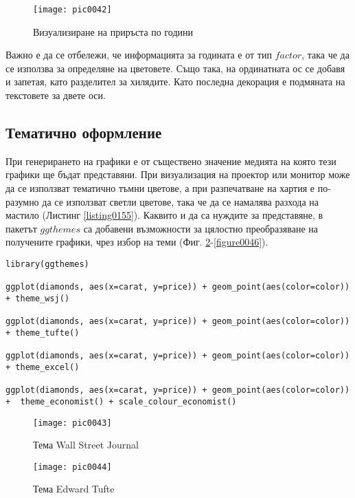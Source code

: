 \begin{figure}[h!]
  \centering
  \texttt{[image: pic0042]}
  \caption{Визуализиране на приръста по години}
\label{figure0042}
\end{figure}
\FloatBarrier

Важно е да се отбележи, че информацията за годината е от тип $factor$, така че да се използва за определяне на цветовете. Също така, на ординатната ос се добавя и запетая, като разделител за хилядите. Като последна декорация е подмяната на текстовете за двете оси. 

\subsection{Тематично оформление}

При генерирането на графики е от съществено значение медията на която тези графики ще бъдат представяни. При визуализация на проектор или монитор може да се използват тематично тъмни цветове, а при разпечатване на хартия е по-разумно да се използват светли цветове, така че да се намалява разхода на мастило (Листинг \ref{listing0155}). Каквито и да са нуждите за представяне, в пакетът $ggthemes$ са добавени възможности за цялостно преобразяване на получените графики, чрез избор на теми (Фиг. \ref{figure0043}-\ref{figure0046}).

\begin{lstlisting}[caption=Избор на теми за визуално представяне, label=listing0155]
library(ggthemes)

ggplot(diamonds, aes(x=carat, y=price)) + geom_point(aes(color=color)) + theme_wsj()

ggplot(diamonds, aes(x=carat, y=price)) + geom_point(aes(color=color)) + theme_tufte()

ggplot(diamonds, aes(x=carat, y=price)) + geom_point(aes(color=color)) + theme_excel()

ggplot(diamonds, aes(x=carat, y=price)) + geom_point(aes(color=color)) +  theme_economist() + scale_colour_economist()
\end{lstlisting}

\begin{figure}[h!]
  \centering
  \texttt{[image: pic0043]}
  \caption{Тема Wall Street Journal}
\label{figure0043}
\end{figure}
\FloatBarrier

\begin{figure}[h!]
  \centering
  \texttt{[image: pic0044]}
  \caption{Тема Edward Tufte}
\label{figure0044}
\end{figure}
\FloatBarrier

